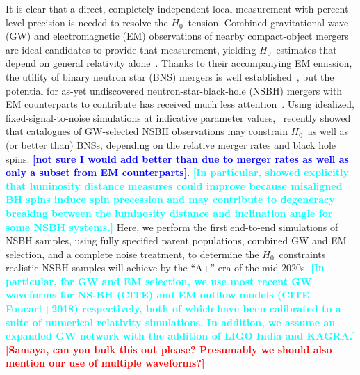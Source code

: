 \documentclass[%
 reprint,
 superscriptaddress,
 nofootinbib,
 amsmath,amssymb,
 aps,
]{revtex4-2}
\newcommand{\hubble}{\ensuremath{H_0}}
\newcommand{\smf}[1]{\textcolor{red}{\bf [#1]}}
\newcommand{\samaya}[1]{\textcolor{cyan}{\bf [#1]}}
\newcommand{\samayacomments}[1]{\textcolor{blue}{\bf [#1]}}
\begin{document}
It is clear that a direct, completely independent local measurement with percent-level precision is needed to resolve the \hubble\ tension. Combined gravitational-wave (GW) and electromagnetic (EM) observations of nearby compact-object mergers are ideal candidates to provide that measurement, yielding \hubble\ estimates that depend on general relativity alone~\cite{Schutz:1986,Holz_Hughes:2005,Dalal:2006,Nissanke_etal:2010,Taylor_etal:2012,Messenger_Read:2012,Nissanke_etal:2013,Oguri:2016,delPozzo:2017,Abbott_etal:2017a,Seto:2018,Chen_etal:2018,Fishbach_etal:2018,Feeney_etal:2018,Mortlock_etal:2019,Soares-Santos_etal:2019,Gray_etal:2019,Palmese_etal:2020,Vasylyev_Filippenko:2020,Chen_etal:2020,Gayathri_etal:2020,Mukherjee_etal:2020}. Thanks to their accompanying EM emission, the utility of binary neutron star (BNS) mergers is well established~\cite{Dalal:2006,Nissanke_etal:2010,Taylor_etal:2012,Messenger_Read:2012,Nissanke_etal:2013,Oguri:2016,delPozzo:2017,Abbott_etal:2017a,Seto:2018,Chen_etal:2018,Fishbach_etal:2018,Feeney_etal:2018,Mortlock_etal:2019,Gray_etal:2019}, but the potential for as-yet undiscovered neutron-star-black-hole (NSBH) mergers with EM counterparts to contribute has received much less attention~\cite{Nissanke_etal:2010,Nissanke_etal:2013,Vitale_Chen:2018}. Using idealized, fixed-signal-to-noise simulations at indicative parameter values,~\citet{Vitale_Chen:2018} recently showed that catalogues of GW-selected NSBH observations may constrain \hubble\ as well as (or better than) BNSs, depending on the relative merger rates and black hole spins. \samayacomments{not sure I would add better than due to merger rates as well as only a subset from EM counterparts}. \samaya{In particular, \citet{Vitale_Chen:2018} showed explicitly that luminosity distance measures could improve because misaligned BH spins induce spin precession and may contribute to degeneracy breaking between the luminosity distance and inclination angle for some NSBH systems.} Here, we perform the first end-to-end simulations of NSBH samples, using fully specified parent populations, combined GW and EM selection, and a complete noise treatment, to determine the \hubble\ constraints realistic NSBH samples will achieve by the ``A+'' era of the mid-2020s. \samaya{In particular, for GW and EM selection, we use most recent GW waveforms for NS-BH (CITE) and EM outflow models (CITE Foucart+2018) respectively, both of which have been calibrated to a suite of numerical relativity simulations. In addition, we assume an expanded GW network with the addition of LIGO India and KAGRA.}  \smf{Samaya, can you bulk this out please? Presumably we should also mention our use of multiple waveforms?}
\end{document}
